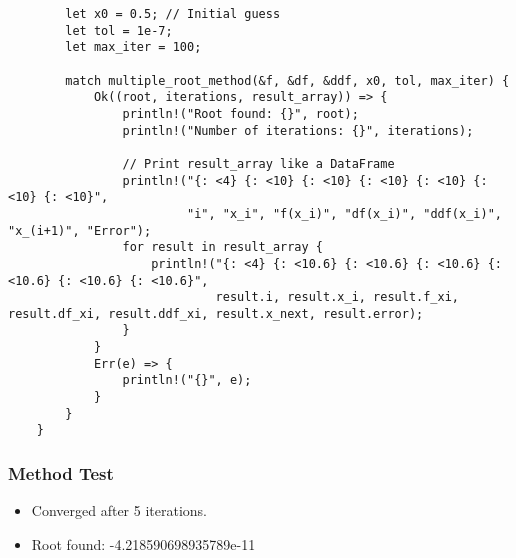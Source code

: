 \documentclass{article}
\begin{document}
\begin{verbatim}
        let x0 = 0.5; // Initial guess
        let tol = 1e-7;
        let max_iter = 100;

        match multiple_root_method(&f, &df, &ddf, x0, tol, max_iter) {
            Ok((root, iterations, result_array)) => {
                println!("Root found: {}", root);
                println!("Number of iterations: {}", iterations);

                // Print result_array like a DataFrame
                println!("{: <4} {: <10} {: <10} {: <10} {: <10} {: <10} {: <10}",
                         "i", "x_i", "f(x_i)", "df(x_i)", "ddf(x_i)", "x_(i+1)", "Error");
                for result in result_array {
                    println!("{: <4} {: <10.6} {: <10.6} {: <10.6} {: <10.6} {: <10.6} {: <10.6}",
                             result.i, result.x_i, result.f_xi, result.df_xi, result.ddf_xi, result.x_next, result.error);
                }
            }
            Err(e) => {
                println!("{}", e);
            }
        }
    }
                \end{verbatim}
        \subsubsection{Method Test}
            \begin{itemize}
                \item Converged after 5 iterations.
                \item Root found: -4.218590698935789e-11
            \end{itemize}

            \hspace*{-5.5cm} %
\end{document}
